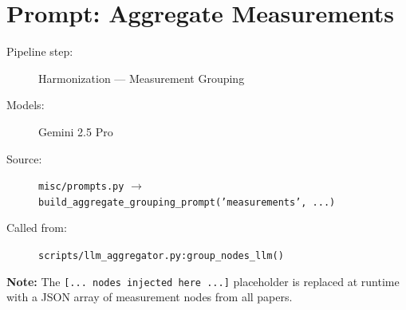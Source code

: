 \section*{Prompt: Aggregate Measurements}
\begin{description}
\item[Pipeline step:] Harmonization --- Measurement Grouping
\item[Models:] Gemini 2.5 Pro
\item[Source:] \texttt{misc/prompts.py} $\rightarrow$ \texttt{build\_aggregate\_grouping\_prompt('measurements', ...)}
\item[Called from:] \texttt{scripts/llm\_aggregator.py:group\_nodes\_llm()}
\end{description}
\begin{tcolorbox}[colback=yellow!8,colframe=yellow!50!black,left=4pt,right=4pt,top=4pt,bottom=4pt,arc=2pt]
\textbf{Note:} The \texttt{[... nodes injected here ...]} placeholder is replaced at runtime with a JSON array of measurement nodes from all papers.
\end{tcolorbox}

